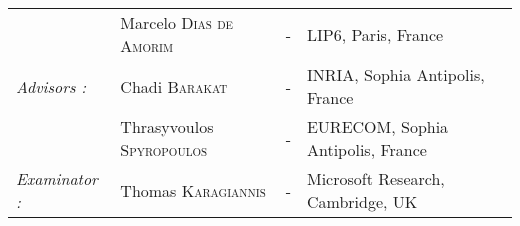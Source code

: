 \begin{titlepage}
\begin{center}
\begin{tabular}{llcl}
                        	& Marcelo \textsc{Dias de Amorim}		& - & LIP6, Paris, France\\
      \textit{Advisors :}	& Chadi \textsc{Barakat}	& - & INRIA, Sophia Antipolis, France\\
                           & Thrasyvoulos \textsc{Spyropoulos}	& - & EURECOM, Sophia Antipolis, France\\
           \textit{Examinator :}   & Thomas \textsc{Karagiannis} & - & Microsoft Research, Cambridge, UK\\
\end{tabular}
\end{center}
\end{titlepage}
\sloppy

\titlepage